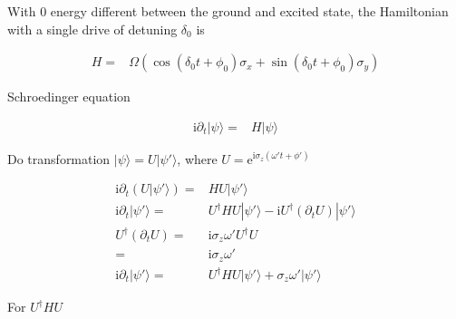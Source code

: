 \documentclass[10pt,fleqn]{article}
\newcommand{\ue}{\mathrm{e}}
\newcommand{\ui}{\mathrm{i}}
\newcommand{\eqar}[1]
{
  \begin{align*}
    #1
  \end{align*}
}
\newcommand{\paren}[1]{{\left({#1}\right)}}
\begin{document}
With $0$ energy different between the ground and excited state, the Hamiltonian
with a single drive of detuning $\delta_0$ is

\eqar{
  H=&\Omega\paren{\cos(\delta_0t+\phi_0)\sigma_x+\sin(\delta_0t+\phi_0)\sigma_y}
}

Schroedinger equation

\eqar{
  \ui\partial_t|\psi\rangle=&H|\psi\rangle
}

Do transformation $|\psi\rangle=U|\psi'\rangle$, where $U=\ue^{\ui\sigma_z(\omega't+\phi')}$

\eqar{
  \ui\partial_t\paren{U|\psi'\rangle}=&HU|\psi'\rangle\\
  \ui\partial_t|\psi'\rangle=&U^\dagger HU|\psi'\rangle-\ui U^\dagger\paren{\partial_t U}|\psi'\rangle\\
  U^\dagger\paren{\partial_t U}=&\ui\sigma_z\omega'U^\dagger U\\
  =&\ui\sigma_z\omega'\\
  \ui\partial_t|\psi'\rangle=&U^\dagger HU|\psi'\rangle+\sigma_z\omega'|\psi'\rangle
}

For $U^\dagger HU$
\end{document}
